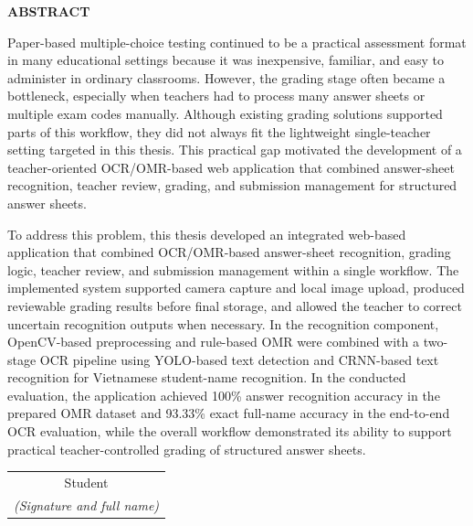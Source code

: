 \documentclass[../Main.tex]{subfiles}
\begin{document}
\begin{center}
    \Large{\textbf{ABSTRACT}}\\
\end{center}
\vspace{1cm}

Paper-based multiple-choice testing continued to be a practical assessment
format in many educational settings because it was inexpensive, familiar, and
easy to administer in ordinary classrooms. However, the grading stage often
became a bottleneck, especially when teachers had to process many answer sheets
or multiple exam codes manually. Although existing grading solutions supported
parts of this workflow, they did not always fit the lightweight single-teacher
setting targeted in this thesis. This practical gap motivated the development of
a teacher-oriented OCR/OMR-based web application that combined answer-sheet
recognition, teacher review, grading, and submission management for structured
answer sheets.

To address this problem, this thesis developed an integrated web-based
application that combined OCR/OMR-based answer-sheet recognition, grading logic,
teacher review, and submission management within a single workflow. The
implemented system supported camera capture and local image upload, produced
reviewable grading results before final storage, and allowed the teacher to
correct uncertain recognition outputs when necessary. In the recognition
component, OpenCV-based preprocessing and rule-based OMR were combined with a
two-stage OCR pipeline using YOLO-based text detection and CRNN-based text
recognition for Vietnamese student-name recognition. In the conducted evaluation,
the application achieved 100\% answer recognition accuracy in the prepared OMR
dataset and 93.33\% exact full-name accuracy in the end-to-end OCR evaluation,
while the overall workflow demonstrated its ability to support practical
teacher-controlled grading of structured answer sheets.

\begin{flushright}
\begin{tabular}{@{}c@{}}
Student\\
\textit{(Signature and full name)}
\end{tabular}
\end{flushright}
\end{document}
